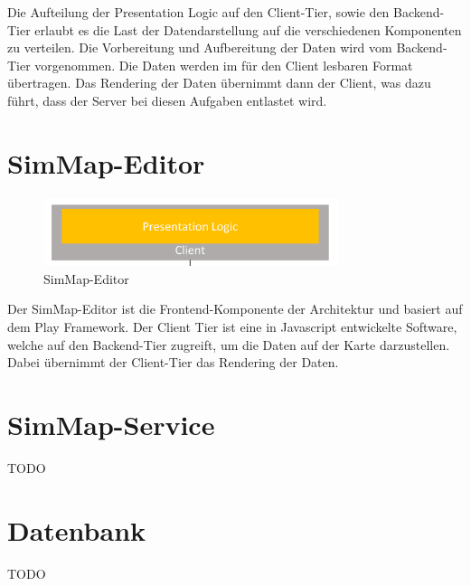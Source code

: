 \noindent
Die Aufteilung der Presentation Logic auf den Client-Tier, sowie den Backend-Tier erlaubt es die Last der Datendarstellung auf die verschiedenen Komponenten zu verteilen. Die Vorbereitung und Aufbereitung der Daten wird vom Backend-Tier vorgenommen. Die Daten werden im für den Client lesbaren Format übertragen. Das Rendering der Daten übernimmt dann der Client, was dazu führt, dass der Server bei diesen Aufgaben entlastet wird.
\newpage
\section{SimMap-Editor}
\begin{figure}[H]
\centering
\includegraphics[height=2cm]{images/presentationlayer.png}
\caption{SimMap-Editor}
\label{fig:presentationlayer}
\end{figure}
\noindent
Der SimMap-Editor ist die Frontend-Komponente der Architektur und basiert auf dem Play Framework. Der Client Tier ist eine in Javascript entwickelte Software, welche auf den Backend-Tier zugreift, um die Daten auf der Karte darzustellen. Dabei übernimmt der Client-Tier das Rendering der Daten.
\section{SimMap-Service}
TODO
\section{Datenbank}
TODO